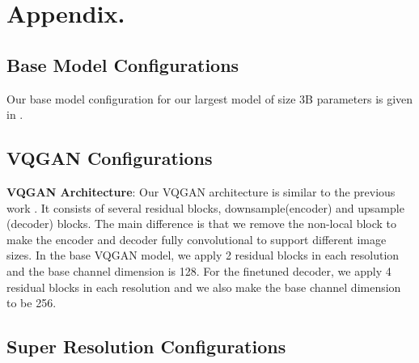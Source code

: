 \section{Appendix.}

\subsection{Base Model Configurations}
\label{sec:base_configs}
Our base model configuration for our largest model of size 3B parameters is given in .



\subsection{VQGAN Configurations}
\label{sec:vqgan_configs}



\textbf{VQGAN Architecture}: Our VQGAN architecture is similar to the previous work \citep{esser2021taming}. It consists of several residual blocks, downsample(encoder) and upsample (decoder) blocks. The main difference is that we remove the non-local block to make the encoder and decoder fully convolutional to support different image sizes. In the base VQGAN model, we apply 2 residual blocks in each resolution and the base channel dimension is 128. For the finetuned decoder, we apply 4 residual blocks in each resolution and we also make the base channel dimension to be 256. 




\subsection{Super Resolution Configurations}
\label{sec:superres_configs}


